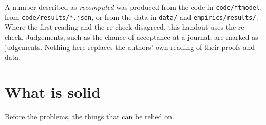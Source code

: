 \begin{notebox}
A number described as \emph{recomputed} was produced from the code in \texttt{code/ftmodel}, from \texttt{code/results/*.json}, or from the data in \texttt{data/} and \texttt{empirics/results/}. Where the first reading and the re-check disagreed, this handout uses the re-check. Judgements, such as the chance of acceptance at a journal, are marked as judgements. Nothing here replaces the authors' own reading of their proofs and data.
\end{notebox}

\section{What is solid}\label{sec:solid}

Before the problems, the things that can be relied on.

